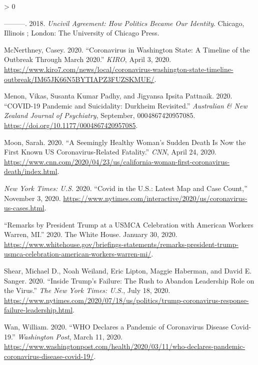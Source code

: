 \documentclass[
  12pt,
]{article}
\newlength{\cslhangindent}
\newenvironment{CSLReferences}[2] %
 {%
  \setlength{\parindent}{0pt}
  \ifodd #1 \everypar{\setlength{\hangindent}{\cslhangindent}}\ignorespaces\fi
  \ifnum #2 > 0
  \setlength{\parskip}{#2\baselineskip}
  \fi
 }%
 {}
\begin{document}
\begin{CSLReferences}{1}{0}
\leavevmode\hypertarget{ref-Mason2018}{}%
---------. 2018. \emph{Uncivil Agreement: How Politics Became Our Identity}. {Chicago, Illinois ; London}: {The University of Chicago Press}.

\leavevmode\hypertarget{ref-McNerthney2020}{}%
McNerthney, Casey. 2020. {``Coronavirus in {Washington} State: {A} Timeline of the Outbreak Through {March} 2020.''} \emph{KIRO}, April 3, 2020. \url{https://www.kiro7.com/news/local/coronavirus-washington-state-timeline-outbreak/IM65JK66N5BYTIAPZ3FUZSKMUE/}.

\leavevmode\hypertarget{ref-Menon2020}{}%
Menon, Vikas, Susanta Kumar Padhy, and Jigyansa Ipsita Pattnaik. 2020. {``{COVID}-19 Pandemic and Suicidality: {Durkheim} Revisited.''} \emph{Australian \& New Zealand Journal of Psychiatry}, September, 0004867420957085. \url{https://doi.org/10.1177/0004867420957085}.

\leavevmode\hypertarget{ref-Moon2020}{}%
Moon, Sarah. 2020. {``A Seemingly Healthy Woman's Sudden Death Is Now the First Known {US} Coronavirus-Related Fatality.''} \emph{CNN}, April 24, 2020. \url{https://www.cnn.com/2020/04/23/us/california-woman-first-coronavirus-death/index.html}.

\leavevmode\hypertarget{ref-nyt2020}{}%
\emph{New York Times: U.S.} 2020. {``Covid in the {U}.{S}.: {Latest Map} and {Case Count},''} November 3, 2020. \url{https://www.nytimes.com/interactive/2020/us/coronavirus-us-cases.html}.

\leavevmode\hypertarget{ref-whitehouse2020}{}%
{``Remarks by {President Trump} at a {USMCA Celebration} with {American Workers} \textbar{} {Warren}, {MI}.''} 2020. {The White House}. January 30, 2020. \url{https://www.whitehouse.gov/briefings-statements/remarks-president-trump-usmca-celebration-american-workers-warren-mi/}.

\leavevmode\hypertarget{ref-Shear2020}{}%
Shear, Michael D., Noah Weiland, Eric Lipton, Maggie Haberman, and David E. Sanger. 2020. {``Inside {Trump}'s {Failure}: {The Rush} to {Abandon Leadership Role} on the {Virus}.''} \emph{The New York Times: U.S.}, July 18, 2020. \url{https://www.nytimes.com/2020/07/18/us/politics/trump-coronavirus-response-failure-leadership.html}.

\leavevmode\hypertarget{ref-Wan2020}{}%
Wan, William. 2020. {``{WHO} Declares a Pandemic of Coronavirus Disease Covid-19.''} \emph{Washington Post}, March 11, 2020. \url{https://www.washingtonpost.com/health/2020/03/11/who-declares-pandemic-coronavirus-disease-covid-19/}.

\end{CSLReferences}
\end{document}

